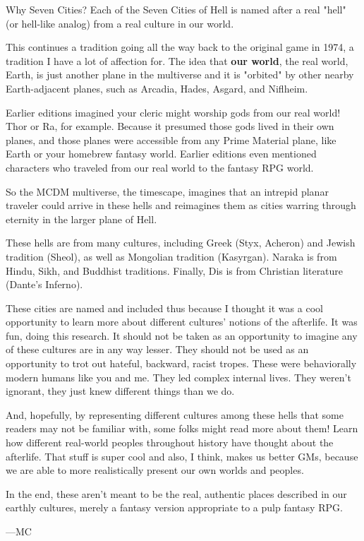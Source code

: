 \documentclass[10pt,a4paper,twoside,bg=print,twocolumn,openany,nodeprecatedcode]{dndbook}
\begin{document}
\begin{DndSidebar}[float=!b]{Why Seven Cities?}
Each of the Seven Cities of Hell is named after a real "hell" (or hell-like analog) from a real culture in our world.



This continues a tradition going all the way back to the original game in 1974, a tradition I have a lot of affection for. The idea that \textbf{our world}, the real world, Earth, is just another plane in the multiverse and it is "orbited" by other nearby Earth-adjacent planes, such as Arcadia, Hades, Asgard, and Niflheim.



Earlier editions imagined your cleric might worship gods from our real world! Thor or Ra, for example. Because it presumed those gods lived in their own planes, and those planes were accessible from any Prime Material plane, like Earth or your homebrew fantasy world. Earlier editions even mentioned characters who traveled from our real world to the fantasy RPG world.



So the MCDM multiverse, the timescape, imagines that an intrepid planar traveler could arrive in these hells and reimagines them as cities warring through eternity in the larger plane of Hell.



These hells are from many cultures, including Greek (Styx, Acheron) and Jewish tradition (Sheol), as well as Mongolian tradition (Kasyrgan). Naraka is from Hindu, Sikh, and Buddhist traditions. Finally, Dis is from Christian literature (Dante's Inferno).



These cities are named and included thus because I thought it was a cool opportunity to learn more about different cultures' notions of the afterlife. It was fun, doing this research. It should not be taken as an opportunity to imagine any of these cultures are in any way lesser. They should not be used as an opportunity to trot out hateful, backward, racist tropes. These were behaviorally modern humans like you and me. They led complex internal lives. They weren't ignorant, they just knew different things than we do.



And, hopefully, by representing different cultures among these hells that some readers may not be familiar with, some folks might read more about them! Learn how different real-world peoples throughout history have thought about the afterlife. That stuff is super cool and also, I think, makes us better GMs, because we are able to more realistically present our own worlds and peoples.



In the end, these aren't meant to be the real, authentic places described in our earthly cultures, merely a fantasy version appropriate to a pulp fantasy RPG.



—MC



\end{DndSidebar}
\end{document}
